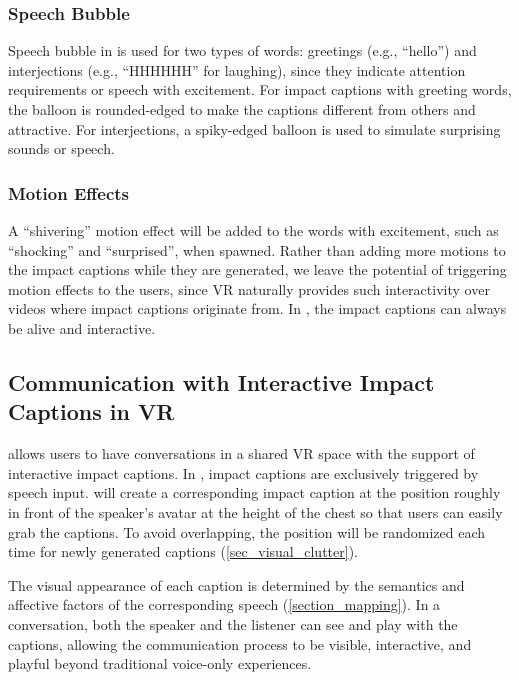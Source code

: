 \subsubsection{Speech Bubble}
Speech bubble in \system{} is used for two types of words: greetings (e.g., ``hello'') and interjections (e.g., ``HHHHHH'' for laughing), since they indicate attention requirements or speech with excitement.
For impact captions with greeting words, the balloon is rounded-edged to make the captions different from others and attractive. For interjections, a spiky-edged balloon is used to simulate surprising sounds or speech.

\subsubsection{Motion Effects}
A ``shivering'' motion effect will be added to the words with excitement, such as ``shocking'' and ``surprised'', when spawned. 
Rather than adding more motions to the impact captions while they are generated, we leave the potential of triggering motion effects to the users, since VR naturally provides such interactivity over videos where impact captions originate from. In \system{}, the impact captions can always be alive and interactive.


\subsection{Communication with Interactive Impact Captions in VR}
\label{sec_interactivity_functions}
\system{} allows users to have conversations in a shared VR space with the support of interactive impact captions. In \system{}, impact captions are exclusively triggered by speech input. 
\system{} will create a corresponding impact caption at the position roughly in front of the speaker’s avatar at the height of the chest so that users can easily grab the captions. To avoid overlapping, the position will be randomized each time for newly generated captions (\autoref{sec_visual_clutter}).

The visual appearance of each caption is determined by the semantics and affective factors of the corresponding speech (\autoref{section_mapping}). In a conversation, both the speaker and the listener can see and play with the captions, allowing the communication process to be visible, interactive, and playful beyond traditional voice-only experiences.


